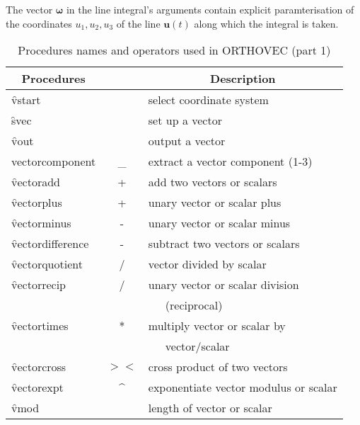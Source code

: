 The vector $\mathbf{\omega}$ in the line integral's arguments contain
explicit paramterisation of the coordinates $u_1, u_2, u_3$ of the
line $\mathbf{u}(t)$ along which the integral is taken.

\begin{table}
\begin{center}
\begin{tabular}{|l c l|} \hline 
\multicolumn{1}{|c}{Procedures} & & \multicolumn{1}{c|}{Description} \\ \hline
  \f{vstart} & & select coordinate system \\[\baselineskip]
  \f{svec} & & set up a vector \\
  \f{vout} & & output a vector \\
\f{ vectorcomponent} & \_ & extract a vector component (1-3) \\[\baselineskip]
\f{vectoradd} & + & add two vectors or scalars \\ 
\f{vectorplus} & + & unary vector or scalar plus\\ 
\f{vectorminus} & - & unary vector or scalar minus\\ 
\f{vectordifference} & - & subtract two vectors or scalars \\ 
\f{vectorquotient} & / & vector divided by scalar \\ 
\f{vectorrecip} & / & unary vector or scalar division \\ & & \ \ \ (reciprocal)\\ 
\f{vectortimes} & * & multiply vector or scalar by \\ & & \ \ \ vector/scalar \\ 
\f{vectorcross} & $><$ & cross product of two vectors \\ 
\f{vectorexpt} & \^{} & exponentiate vector modulus or scalar \\
\f{vmod} & & length of vector or scalar \\ \hline
\end{tabular}
\end{center}
\caption{Procedures names and operators used in \textsc{ORTHOVEC} (part 1)}
\end{table}

